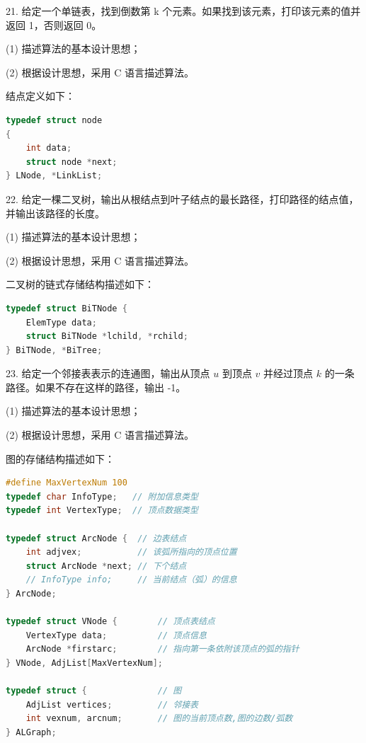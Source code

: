 21. 给定一个单链表，找到倒数第 k 个元素。如果找到该元素，打印该元素的值并返回 1，否则返回 0。

(1) 描述算法的基本设计思想；

(2) 根据设计思想，采用 C 语言描述算法。

结点定义如下：

\begin{lstlisting}[language=C, basicstyle=\ttfamily]
typedef struct node
{
    int data;
    struct node *next;
} LNode, *LinkList;
\end{lstlisting}

\vspace{15em}

\newpage

22. 给定一棵二叉树，输出从根结点到叶子结点的最长路径，打印路径的结点值，并输出该路径的长度。

(1) 描述算法的基本设计思想；

(2) 根据设计思想，采用 C 语言描述算法。

二叉树的链式存储结构描述如下：

\begin{lstlisting}[language=C, basicstyle=\ttfamily]
typedef struct BiTNode {
    ElemType data;
    struct BiTNode *lchild, *rchild;
} BiTNode, *BiTree;
\end{lstlisting}

\vspace{15em}

\newpage

23. 给定一个邻接表表示的连通图，输出从顶点 \(u\) 到顶点 \(v\) 并经过顶点 \(k\) 的一条路径。如果不存在这样的路径，输出 -1。

(1) 描述算法的基本设计思想；

(2) 根据设计思想，采用 C 语言描述算法。

图的存储结构描述如下：

\begin{lstlisting}[language=C, basicstyle=\ttfamily]
#define MaxVertexNum 100
typedef char InfoType;   // 附加信息类型
typedef int VertexType;  // 顶点数据类型

typedef struct ArcNode {  // 边表结点
    int adjvex;           // 该弧所指向的顶点位置
    struct ArcNode *next; // 下个结点
    // InfoType info;     // 当前结点（弧）的信息
} ArcNode;

typedef struct VNode {        // 顶点表结点
    VertexType data;          // 顶点信息
    ArcNode *firstarc;        // 指向第一条依附该顶点的弧的指针
} VNode, AdjList[MaxVertexNum];

typedef struct {              // 图
    AdjList vertices;         // 邻接表
    int vexnum, arcnum;       // 图的当前顶点数,图的边数/弧数
} ALGraph;
\end{lstlisting}
